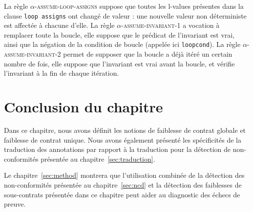 La règle \textsc{$\alpha$-assume-loop-assigns} suppose que toutes les l-values
présentes dans la clause \lstinline'loop assigns' ont changé de valeur : une
nouvelle valeur non déterministe est affectée à chacune d'elle.
La règle \textsc{$\alpha$-assume-invariant-1} a vocation à remplacer toute la
boucle, elle suppose que le prédicat de l'invariant est vrai, ainsi que la
négation de la condition de boucle (appelée ici \lstinline'loopcond').
La règle \textsc{$\alpha$-assume-invariant-2} permet de supposer que la boucle
a déjà itéré un certain nombre de fois, elle suppose que l'invariant est vrai
avant la boucle, et vérifie l'invariant à la fin de chaque itération.


\section*{Conclusion du chapitre}


Dans ce chapitre, nous avons définit les notions de faiblesse de
contrat globale et faiblesse de contrat unique.
Nous avons également présenté les spécificités de la traduction des annotations
par rapport à la traduction pour la détection de non-conformités présentée au
chapitre~\ref{sec:traduction}.

Le chapitre~\ref{sec:method} montrera que l'utilisation combinée de la détection
des non-conformités présentée au chapitre~\ref{sec:ncd} et la détection des
faiblesses de sous-contrats présentée dans ce chapitre peut aider au diagnostic
des échecs de preuve.
